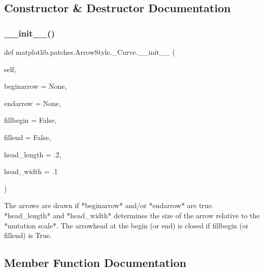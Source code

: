 \subsection{Constructor \& Destructor Documentation}
\mbox{\label{classmatplotlib_1_1patches_1_1ArrowStyle_1_1__Curve_ae604d6a88b746eec93db4767ebea04db}} 
\subsubsection{\texorpdfstring{\+\_\+\+\_\+init\+\_\+\+\_\+()}{\_\_init\_\_()}}
{\footnotesize\ttfamily def matplotlib.\+patches.\+Arrow\+Style.\+\_\+\+Curve.\+\_\+\+\_\+init\+\_\+\+\_\+ (\begin{DoxyParamCaption}\item[{}]{self,  }\item[{}]{beginarrow = {\ttfamily None},  }\item[{}]{endarrow = {\ttfamily None},  }\item[{}]{fillbegin = {\ttfamily False},  }\item[{}]{fillend = {\ttfamily False},  }\item[{}]{head\+\_\+length = {\ttfamily .2},  }\item[{}]{head\+\_\+width = {\ttfamily .1} }\end{DoxyParamCaption})}

\begin{DoxyVerb}The arrows are drawn if *beginarrow* and/or *endarrow* are
true. *head_length* and *head_width* determines the size
of the arrow relative to the *mutation scale*.  The
arrowhead at the begin (or end) is closed if fillbegin (or
fillend) is True.
\end{DoxyVerb}
 

\subsection{Member Function Documentation}
\mbox{\label{classmatplotlib_1_1patches_1_1ArrowStyle_1_1__Curve_aa5e14f8f03c63e8c3af623ce74b275a0}} 
